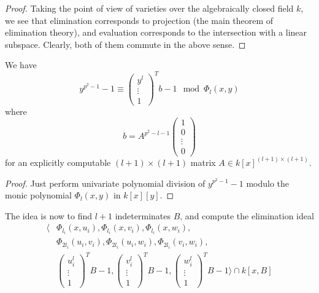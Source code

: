 \begin{proof}
    Taking the point of view of varieties over the algebraically closed field $k$, we see that elimination corresponds to projection (the main theorem of elimination theory), and evaluation corresponds to the intersection with a linear subspace.
    Clearly, both of them commute in the above sense.
\end{proof}
\begin{lemma}
    \label{prop:symbolic_elimination}
    We have
    \begin{equation*}
        y^{p^2 - 1} - 1 \equiv \left(\begin{matrix*}
            y^l \\
            \vdots \\
            1
        \end{matrix*}\right)^T b - 1 \mod \Phi_l(x, y)
    \end{equation*}
    where
    \begin{equation*}
        b = A^{p^2 - l - 1} \left(\begin{matrix*}
            1 \\
            0 \\
            \vdots \\
            0
        \end{matrix*}\right)
    \end{equation*}
    for an explicitly computable $(l + 1) \times (l + 1)$ matrix $A \in k[x]^{(l + 1) \times (l + 1)}$.
\end{lemma}
\begin{proof}
    Just perform univariate polynomial division of $y^{p^2 - 1} - 1$ modulo the monic polynomial $\Phi_l(x, y)$ in $k[x][y]$.
\end{proof}
The idea is now to find $l + 1$ indeterminates $B$, and compute the elimination ideal
\begin{align*}
    \langle &\Phi_{l_i}(x, u_i), \Phi_{l_i}(x, v_i), \Phi_{l_i}(x, w_i), \\
    &\Phi_{2l_i}(u_i, v_i), \Phi_{2l_i}(u_i, w_i), \Phi_{2l_i}(v_i, w_i), \\
    &\left(\begin{matrix*}
        u_i^l \\
        \vdots \\
        1
    \end{matrix*}\right)^T B - 1, \left(\begin{matrix*}
        v_i^l \\
        \vdots \\
        1
    \end{matrix*}\right)^T B - 1, \left(\begin{matrix*}
        w_i^l \\
        \vdots \\
        1
    \end{matrix*}\right)^T B - 1 \rangle \cap k[x, B]
\end{align*}
